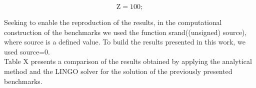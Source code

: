 \documentclass[preprint,12pt,authoryear]{elsarticle}
\begin{document}
\begin{equation}
\textrm{Z} = 100;
\end{equation}

Seeking to enable the reproduction of the results, in the computational construction of the benchmarks we used the function srand((unsigned) source), where source is a defined value. To build the results presented in this work, we used source=0. \\

Table X presents a comparison of the results obtained by applying the analytical method and the LINGO solver for the solution of the previously presented benchmarks.





\begin{thebibliography}{00}


\bibitem[ ()]{}

\end{thebibliography}
\end{document}
